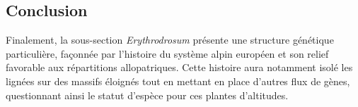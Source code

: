 \subsection{Conclusion}

Finalement, la sous-section \textit{Erythrodrosum} présente une structure génétique particulière, façonnée par l'histoire du système alpin européen et son relief favorable aux répartitions allopatriques. Cette histoire aura notamment isolé les lignées sur des massifs éloignés tout en mettant en place d'autres flux de gènes, questionnant ainsi le statut d'espèce pour ces plantes d'altitudes.

